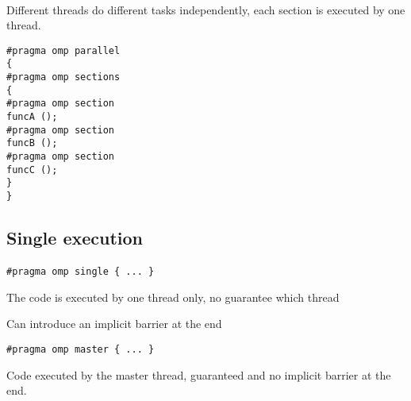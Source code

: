 \documentclass[%
oneside,                 %
final,                   %
10pt]{article}
\begin{document}
\paragraph{}

Different threads do different tasks independently, each section is executed by one thread.













\begin{verbatim}
#pragma omp parallel
{
#pragma omp sections
{
#pragma omp section
funcA ();
#pragma omp section
funcB ();
#pragma omp section
funcC ();
}
}

\end{verbatim}



\subsection*{Single execution}

\paragraph{}


\begin{verbatim}
#pragma omp single { ... }

\end{verbatim}

The code is executed by one thread only, no guarantee which thread

Can introduce an implicit barrier at the end


\begin{verbatim}
#pragma omp master { ... }

\end{verbatim}

Code executed by the master thread, guaranteed and no implicit barrier at the end.
\end{document}
